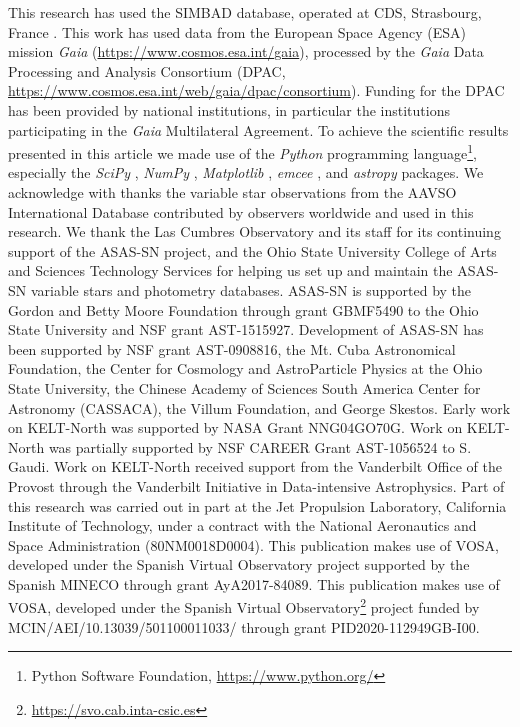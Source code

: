 \documentclass{aa}
\begin{document}
\begin{acknowledgements}

This research has used the SIMBAD database, operated at CDS, Strasbourg, France \citep{wenger2000}.
%
This work has used data from the European Space Agency (ESA) mission {\it Gaia} (\url{https://www.cosmos.esa.int/gaia}), processed by the {\it Gaia} Data Processing and Analysis Consortium (DPAC, \url{https://www.cosmos.esa.int/web/gaia/dpac/consortium}).
%
Funding for the DPAC has been provided by national institutions, in particular the institutions participating in the {\it Gaia} Multilateral Agreement.
%
To achieve the scientific results presented in this article we made use of the \emph{Python} programming language\footnote{Python Software Foundation, \url{https://www.python.org/}}, especially the \emph{SciPy} \citep{virtanen2020}, \emph{NumPy} \citep{numpy}, \emph{Matplotlib} \citep{Matplotlib}, \emph{emcee} \citep{foreman-mackey2013}, and \emph{astropy} \citep{astropy_1,astropy_2} packages.
%
We acknowledge with thanks the variable star observations from the AAVSO International Database contributed by observers worldwide and used in this research.
%
We thank the Las Cumbres Observatory and its staff for its continuing support of the ASAS-SN project, and the Ohio State University College of Arts and Sciences Technology Services for helping us set up and maintain the ASAS-SN variable stars and photometry databases.
%
ASAS-SN is supported by the Gordon and Betty Moore Foundation through grant GBMF5490 to the Ohio State University and NSF grant AST-1515927.
%
Development of ASAS-SN has been supported by NSF grant AST-0908816, the Mt. Cuba Astronomical Foundation, the Center for Cosmology and AstroParticle Physics at the Ohio State University, the Chinese Academy of Sciences South America Center for Astronomy (CASSACA), the Villum Foundation, and George Skestos.
%
Early work on KELT-North was supported by NASA Grant NNG04GO70G.
%
Work on KELT-North was partially supported by NSF CAREER Grant AST-1056524 to S. Gaudi.
%
Work on KELT-North received support from the Vanderbilt Office of the Provost through the Vanderbilt Initiative in Data-intensive Astrophysics.
%
Part of this research was carried out in part at the Jet Propulsion Laboratory, California Institute of Technology, under a contract with the National Aeronautics and Space Administration (80NM0018D0004).
%
This publication makes use of VOSA, developed under the Spanish Virtual Observatory project supported by the Spanish MINECO through grant AyA2017-84089.
%
This publication makes use of VOSA, developed under the Spanish Virtual Observatory\footnote{\url{https://svo.cab.inta-csic.es}} project funded by MCIN/AEI/10.13039/501100011033/ through grant PID2020-112949GB-I00.

\end{acknowledgements}
\end{document}
